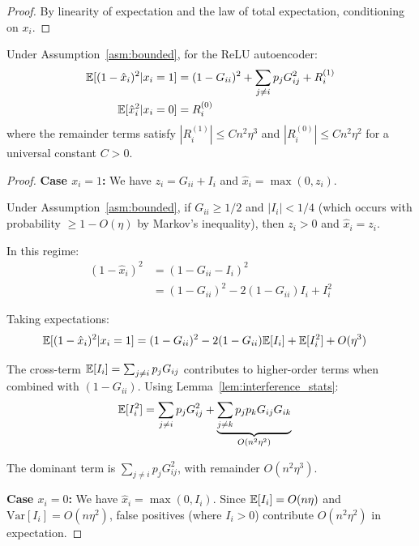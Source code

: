 \begin{proof}
By linearity of expectation and the law of total expectation, conditioning on $x_i$.
\end{proof}

\begin{lemma}
\label{lem:taylor}
Under Assumption~\ref{asm:bounded}, for the ReLU autoencoder:
\begin{align}
\mathbb{E}[(1 - \hat{x}_i)^2 | x_i = 1] &= (1 - G_{ii})^2 + \sum_{j \neq i} p_j G_{ij}^2 + R_i^{(1)} \\
\mathbb{E}[\hat{x}_i^2 | x_i = 0] &= R_i^{(0)}
\end{align}
where the remainder terms satisfy $|R_i^{(1)}| \leq C n^2 \eta^3$ and $|R_i^{(0)}| \leq C n^2 \eta^2$ for a universal constant $C > 0$.
\end{lemma}

\begin{proof}
\textbf{Case $x_i = 1$:} We have $z_i = G_{ii} + I_i$ and $\hat{x}_i = \max(0, z_i)$.

Under Assumption~\ref{asm:bounded}, if $G_{ii} \geq 1/2$ and $|I_i| < 1/4$ (which occurs with probability $\geq 1 - O(\eta)$ by Markov's inequality), then $z_i > 0$ and $\hat{x}_i = z_i$.

In this regime:
\begin{align}
(1 - \hat{x}_i)^2 &= (1 - G_{ii} - I_i)^2 \\
&= (1 - G_{ii})^2 - 2(1 - G_{ii})I_i + I_i^2
\end{align}

Taking expectations:
\begin{align}
\mathbb{E}[(1 - \hat{x}_i)^2 | x_i = 1] &= (1 - G_{ii})^2 - 2(1-G_{ii})\mathbb{E}[I_i] + \mathbb{E}[I_i^2] + O(\eta^3)
\end{align}

The cross-term $\mathbb{E}[I_i] = \sum_{j \neq i} p_j G_{ij}$ contributes to higher-order terms when combined with $(1-G_{ii})$. Using Lemma~\ref{lem:interference_stats}:
\begin{align}
\mathbb{E}[I_i^2] &= \sum_{j \neq i} p_j G_{ij}^2 + \underbrace{\sum_{j \neq k} p_j p_k G_{ij} G_{ik}}_{O(n^2 \eta^2)}
\end{align}

The dominant term is $\sum_{j \neq i} p_j G_{ij}^2$, with remainder $O(n^2\eta^3)$.

\textbf{Case $x_i = 0$:} We have $\hat{x}_i = \max(0, I_i)$. Since $\mathbb{E}[I_i] = O(n\eta)$ and $\text{Var}[I_i] = O(n\eta^2)$, false positives (where $I_i > 0$) contribute $O(n^2\eta^2)$ in expectation.
\end{proof}

